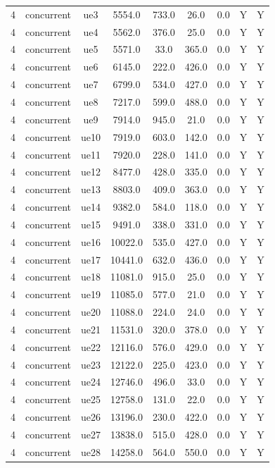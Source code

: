 \begin{table}[ht]
\begin{tabular}{|c|c|c|c|c|c|c|c|c|}
4 & concurrent & ue3 & 5554.0 & 733.0 & 26.0 & 0.0 & Y & Y \\
4 & concurrent & ue4 & 5562.0 & 376.0 & 25.0 & 0.0 & Y & Y \\
4 & concurrent & ue5 & 5571.0 & 33.0 & 365.0 & 0.0 & Y & Y \\
4 & concurrent & ue6 & 6145.0 & 222.0 & 426.0 & 0.0 & Y & Y \\
4 & concurrent & ue7 & 6799.0 & 534.0 & 427.0 & 0.0 & Y & Y \\
4 & concurrent & ue8 & 7217.0 & 599.0 & 488.0 & 0.0 & Y & Y \\
4 & concurrent & ue9 & 7914.0 & 945.0 & 21.0 & 0.0 & Y & Y \\
4 & concurrent & ue10 & 7919.0 & 603.0 & 142.0 & 0.0 & Y & Y \\
4 & concurrent & ue11 & 7920.0 & 228.0 & 141.0 & 0.0 & Y & Y \\
4 & concurrent & ue12 & 8477.0 & 428.0 & 335.0 & 0.0 & Y & Y \\
4 & concurrent & ue13 & 8803.0 & 409.0 & 363.0 & 0.0 & Y & Y \\
4 & concurrent & ue14 & 9382.0 & 584.0 & 118.0 & 0.0 & Y & Y \\
4 & concurrent & ue15 & 9491.0 & 338.0 & 331.0 & 0.0 & Y & Y \\
4 & concurrent & ue16 & 10022.0 & 535.0 & 427.0 & 0.0 & Y & Y \\
4 & concurrent & ue17 & 10441.0 & 632.0 & 436.0 & 0.0 & Y & Y \\
4 & concurrent & ue18 & 11081.0 & 915.0 & 25.0 & 0.0 & Y & Y \\
4 & concurrent & ue19 & 11085.0 & 577.0 & 21.0 & 0.0 & Y & Y \\
4 & concurrent & ue20 & 11088.0 & 224.0 & 24.0 & 0.0 & Y & Y \\
4 & concurrent & ue21 & 11531.0 & 320.0 & 378.0 & 0.0 & Y & Y \\
4 & concurrent & ue22 & 12116.0 & 576.0 & 429.0 & 0.0 & Y & Y \\
4 & concurrent & ue23 & 12122.0 & 225.0 & 423.0 & 0.0 & Y & Y \\
4 & concurrent & ue24 & 12746.0 & 496.0 & 33.0 & 0.0 & Y & Y \\
4 & concurrent & ue25 & 12758.0 & 131.0 & 22.0 & 0.0 & Y & Y \\
4 & concurrent & ue26 & 13196.0 & 230.0 & 422.0 & 0.0 & Y & Y \\
4 & concurrent & ue27 & 13838.0 & 515.0 & 428.0 & 0.0 & Y & Y \\
4 & concurrent & ue28 & 14258.0 & 564.0 & 550.0 & 0.0 & Y & Y \\

\end{tabular}
\end{table}
